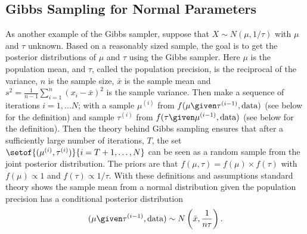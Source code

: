 \documentclass[12pt]{article}
\begin{document}
\subsection*{Gibbs Sampling for Normal Parameters}

As another example of the Gibbs sampler, suppose that \( X \sim N(\mu,
1/\tau) \) with \( \mu \) and \( \tau \) unknown.  Based on a reasonably
sized sample, the goal is to get the posterior distributions of \( \mu \)
and \( \tau \) using the Gibbs sampler.  Here \( \mu \) is the
population mean, and \( \tau \), called the population precision, is the
reciprocal of the variance, \( n \) is the sample size, \( \bar{x} \) is
the sample mean and \( s^2 = \frac{1}{n-1} \sum\limits_{i=1}^n (x_i -
\bar{x})^2 \) is the sample variance.  Then make a sequence of
iterations \( i = 1, \dots N \); with a sample \( \mu^{(i)} \) from \( f
(\mu \given \tau^{(i-1)}, \text{data}) \) (see below for the definition)
and sample \( \tau^{(i)} \) from \( f(\tau \given \mu^{(i-1)}, \text{data})
\) (see below for the definition).  Then the theory behind Gibbs
sampling ensures that after a sufficiently large number of iterations, \(
T \), the set \( \setof{(\mu^{(i)}, \tau^{(i)})}{i = T+1, \dots, N} \)
can be seen as a random sample from the joint posterior distribution.
The priors are that \( f(\mu, \tau) = f(\mu) \times f(\tau) \) with \( f
(\mu) \propto 1 \) and \( f(\tau) \propto 1/\tau \).  With these
definitions and assumptions standard theory shows the sample mean from a
normal distribution given the population precision has a conditional
posterior distribution
\[
    (\mu \given \tau^{(i-1)}, \text{data}) \sim N\left(\bar{x}, \frac{1}
    {n \tau} \right).
\]
\end{document}
